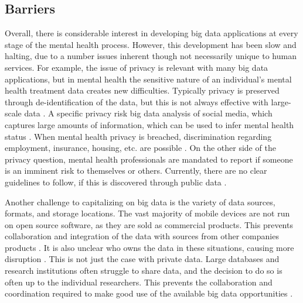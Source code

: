 \documentclass[sigconf]{acmart}
\begin{document}
\subsection{Barriers}
Overall, there is considerable interest in developing big data applications at every stage of the mental health process. However, this development has been slow and halting, due to a number issues inherent though not necessarily unique to human services. 
For example, the issue of privacy is relevant with many big data applications, but in mental health the sensitive nature of an individual's mental health treatment data creates new difficulties. Typically privacy is preserved through de-identification of the data, but this is not always effective with large-scale data \cite{bigdatabipolar}. A specific privacy risk big data analysis of social media, which captures large amounts of information, which can be used to infer mental health status \cite{detectdepressionsocialmedia}. When mental health privacy is breached, discrimination regarding employment, insurance, housing, etc. are possible \cite{bigdatabipolar}. On the other side of the privacy question, mental health professionals are mandated to report if someone is an imminent risk to themselves or others. Currently, there are no clear guidelines to follow, if this is discovered through public data \cite{detectdepressionsocialmedia}.

Another challenge to capitalizing on big data is the variety of data sources, formats, and storage locations. The vast majority of mobile devices are not run on open source software, as they are sold as commercial products. This prevents collaboration and integration of the data with sources from other companies products \cite{bdfragment}. It is also unclear who owns the data in these situations, causing more disruption \cite{bigdatabipolar}. This is not just the case with private data. Large databases and research institutions often struggle to share data, and the decision to do so is often up to the individual researchers. This prevents the collaboration and coordination required to make good use of the available big data opportunities \cite{openinfrastructure}.
\end{document}
